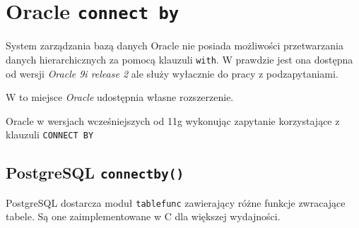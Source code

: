 \section{Oracle \texttt{connect by}}



System zarządzania bazą danych Oracle nie posiada możliwości przetwarzania danych hierarchicznych za pomocą klauzuli \texttt{with}.
W prawdzie jest ona dostępna od wersji \emph{Oracle 9i release 2} ale służy wyłacznie do pracy z podzapytaniami.

W to miejsce \emph{Oracle} udostępnia własne rozszerzenie.









Oracle w wersjach wcześniejszych od 11g wykonując zapytanie korzystające z klauzuli \texttt{CONNECT BY}




\subsection*{PostgreSQL \texttt{connectby()}}

PostgreSQL dostarcza moduł \texttt{tablefunc} zawierający różne funkcje zwracające tabele.
Są one zaimplementowane w C dla większej wydajności.

